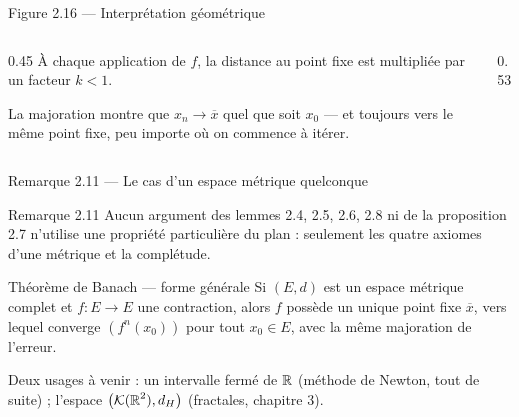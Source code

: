 \begin{frame}{Figure 2.16 --- Interprétation géométrique}
  \begin{columns}[c]
    \begin{column}{0.45\textwidth}
      \small À chaque application de $f$, la distance au point fixe est
      multipliée par un facteur $k<1$.
      \vspace{6pt}

      La majoration montre que $x_n\to\overline{x}$ quel que
      soit $x_0$ --- et toujours vers le même point fixe,
      peu importe où on commence à itérer.
    \end{column}
    \begin{column}{0.53\textwidth}
    \end{column}
  \end{columns}
\end{frame}

\begin{frame}{Remarque 2.11 --- Le cas d'un espace métrique quelconque}
  \begin{Rem}{Remarque 2.11}
    \small Aucun argument des lemmes 2.4, 2.5, 2.6, 2.8 ni de la
    proposition 2.7 n'utilise une propriété particulière du plan :
    seulement les quatre axiomes d'une métrique et la
    complétude.
  \end{Rem}
  \begin{Enonce}{Théorème de Banach --- forme générale}
    \small Si $(E,d)$ est un espace métrique complet et
    $f:E\to E$ une contraction, alors $f$ possède un unique point fixe
    $\overline{x}$, vers lequel converge $(f^n(x_0))$ pour tout
    $x_0\in E$, avec la même majoration de l'erreur.
  \end{Enonce}
  \small Deux usages à venir : un intervalle fermé de $\operatorname{\mathbb{R}}$ (méthode de
  Newton, tout de suite) ; l'espace $\big(\mathcal{K}(\operatorname{\mathbb{R}}^2),d_H\big)$
  (fractales, chapitre 3).
\end{frame}
